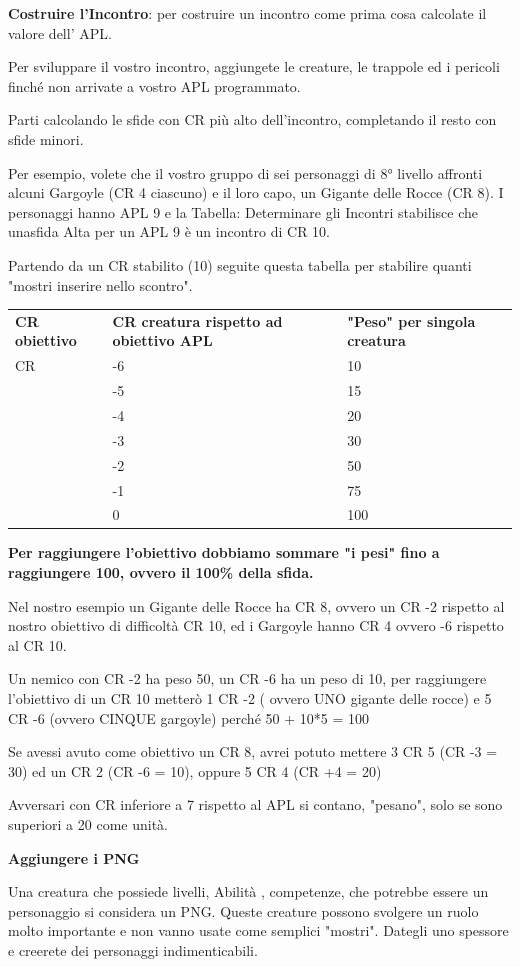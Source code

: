 \documentclass[a4paper,11pt,twoside,openany]{book}
\begin{document}
{\bigskip

\textbf{Costruire l'Incontro}: per costruire un incontro come prima cosa calcolate il valore dell' APL.

Per sviluppare il vostro incontro, aggiungete le creature, le trappole ed i pericoli finché non arrivate a vostro APL programmato.

Parti calcolando le sfide con CR più alto dell'incontro, completando il resto con sfide minori.

Per esempio, volete che il vostro gruppo di sei personaggi di 8° livello affronti alcuni Gargoyle (CR 4 ciascuno) e il loro capo, un Gigante delle Rocce (CR 8). I personaggi hanno APL 9 e la Tabella: Determinare gli Incontri stabilisce che unasfida Alta per un APL 9 è un incontro di CR 10.

Partendo da un CR stabilito (10) seguite questa tabella per stabilire quanti "mostri inserire nello scontro".

\bigskip

\begin{tabular}{lll}
\toprule
\textbf{CR obiettivo} & \textbf{CR creatura rispetto ad obiettivo APL} & \textbf{"Peso" per singola creatura}\tabularnewline
CR & -6 & 10\tabularnewline
 & -5 & 15\tabularnewline
 & -4 & 20\tabularnewline
 & -3 & 30\tabularnewline
 & -2 & 50\tabularnewline
 & -1 & 75\tabularnewline
 & 0 & 100\tabularnewline
\end{tabular}

\bigskip

\textbf{Per raggiungere l'obiettivo dobbiamo sommare "i pesi"
fino a raggiungere 100, ovvero il 100\% della sfida.}

Nel nostro esempio un Gigante delle Rocce ha CR 8, ovvero un CR -2 rispetto al nostro obiettivo di difficoltà CR 10, ed i Gargoyle hanno CR 4 ovvero -6 rispetto al CR 10.

Un nemico con CR -2 ha peso 50, un CR -6 ha un peso di 10, per raggiungere l'obiettivo di un CR 10 metterò 1 CR -2 ( ovvero UNO gigante delle rocce) e 5 CR -6 (ovvero CINQUE gargoyle) perché 50 + 10{*}5 = 100

Se avessi avuto come obiettivo un CR 8, avrei potuto mettere 3 CR 5 (CR -3 = 30) ed un CR 2 (CR -6 = 10), oppure 5 CR 4 (CR +4 = 20)

Avversari con CR inferiore a 7 rispetto al APL si contano, "pesano", solo se sono superiori a 20 come unità.

\textbf{Aggiungere i PNG}

Una creatura che possiede livelli, Abilità , competenze, che potrebbe essere un personaggio si considera un PNG. Queste creature possono svolgere un ruolo molto importante e non vanno usate come semplici "mostri". Dategli uno spessore e creerete dei personaggi indimenticabili.

}
\end{document}
